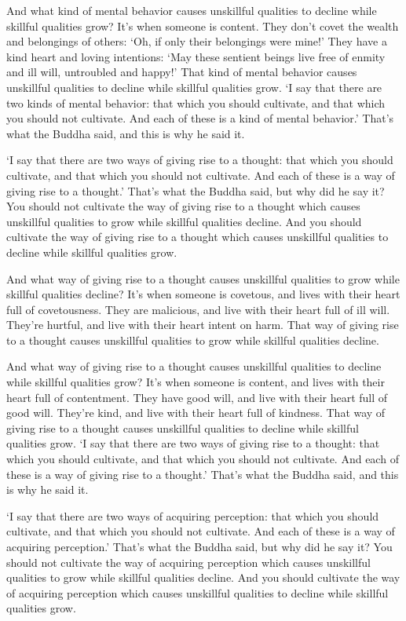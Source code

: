 \documentclass[12pt,openany]{book}%
\begin{document}
And what kind of mental behavior causes unskillful qualities to decline while skillful qualities grow? It’s when someone is content. They don’t covet the wealth and belongings of others: ‘Oh, if only their belongings were mine!’ They have a kind heart and loving intentions: ‘May these sentient beings live free of enmity and ill will, untroubled and happy!’ That kind of mental behavior causes unskillful qualities to decline while skillful qualities grow. ‘I say that there are two kinds of mental behavior: that which you should cultivate, and that which you should not cultivate. And each of these is a kind of mental behavior.’ That’s what the Buddha said, and this is why he said it. 

‘I say that there are two ways of giving rise to a thought: that which you should cultivate, and that which you should not cultivate. And each of these is a way of giving rise to a thought.’ That’s what the Buddha said, but why did he say it? You should not cultivate the way of giving rise to a thought which causes unskillful qualities to grow while skillful qualities decline. And you should cultivate the way of giving rise to a thought which causes unskillful qualities to decline while skillful qualities grow. 

And what way of giving rise to a thought causes unskillful qualities to grow while skillful qualities decline? It’s when someone is covetous, and lives with their heart full of covetousness. They are malicious, and live with their heart full of ill will. They’re hurtful, and live with their heart intent on harm. That way of giving rise to a thought causes unskillful qualities to grow while skillful qualities decline. 

And what way of giving rise to a thought causes unskillful qualities to decline while skillful qualities grow? It’s when someone is content, and lives with their heart full of contentment. They have good will, and live with their heart full of good will. They’re kind, and live with their heart full of kindness. That way of giving rise to a thought causes unskillful qualities to decline while skillful qualities grow. ‘I say that there are two ways of giving rise to a thought: that which you should cultivate, and that which you should not cultivate. And each of these is a way of giving rise to a thought.’ That’s what the Buddha said, and this is why he said it. 

‘I say that there are two ways of acquiring perception: that which you should cultivate, and that which you should not cultivate. And each of these is a way of acquiring perception.’ That’s what the Buddha said, but why did he say it? You should not cultivate the way of acquiring perception which causes unskillful qualities to grow while skillful qualities decline. And you should cultivate the way of acquiring perception which causes unskillful qualities to decline while skillful qualities grow. 
\end{document}
